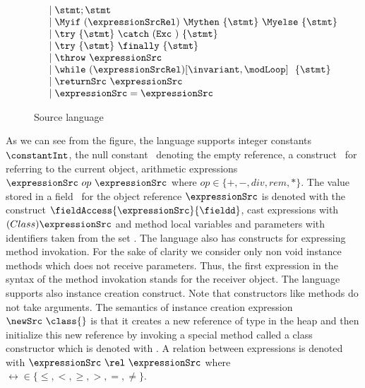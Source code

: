\begin{figure}[ht!]
\begin{frameit}
$$\begin{array} {ll}
                                & \mid \stmt;\stmt \\
                                & \mid \Myif \ (\expressionSrcRel) \ \Mythen \ \{ \stmt \} \  \Myelse \ \{ \stmt \}  \\
			        & \mid \try  \ \{ \stmt \}  \ \catch \ ( \mbox{\rm\texttt{Exc} } )\ \{ \stmt \} \\
		                & \mid \try  \ \{ \stmt \} \ \finally \ \{ \stmt \} \\
				& \mid \throw \ \expressionSrc  \\
                                & \mid \while \ (\expressionSrcRel) \lbrack \invariant, \modLoop \rbrack \ \do \ \{ \stmt \}\ \\
				& \mid \returnSrc \  \expressionSrc \\
                   		& \mid \expressionSrc = \expressionSrc \\        
    \end{array} $$
\caption{\sc Source language}
\label{source:grammar}
\end{frameit}
\end{figure}


    As we can see from the figure, the language supports 
    integer constants $\constantInt$, the null constant \Mynull \ 
    denoting  the empty reference, a construct \this \ for referring to the current object,  
    arithmetic expressions  $\expressionSrc \ op \ \expressionSrc$ where $op \in  \{+ , - , div , rem, * \}$.
    The value stored in a field \fieldd \ for the object reference $\expressionSrc $ is denoted with
    the construct  $ \fieldAccess{\expressionSrc}{\fieldd} $, cast expressions with   $(Class) \expressionSrc$
    and method local variables  and parameters with identifiers taken from the set \var.  
    The language also has constructs for expressing method invokation.  For the sake of clarity we consider only non void  instance  methods which does not 
    receive parameters.
    Thus, the first expression in the syntax of the method invokation stands for the receiver object.  
    The language supports also instance creation construct. Note that constructors like methods do not take arguments.
    The semantics of instance creation expression $\newSrc \ \class{}$  is that it 
    creates a new reference of type \class{} in the heap and then initialize this new reference
    by invoking a special method called a class constructor which is denoted with \Constructor{\class}.
    A relation between    expressions is denoted with
    $\expressionSrc \ \rel \ \expressionSrc $ where $\rel  \in \{ \le, < ,  \ge, >, = , \neq \}$.
  
